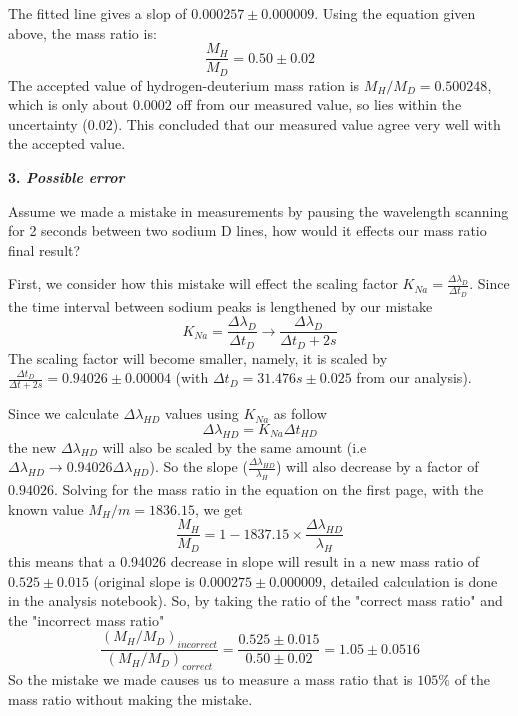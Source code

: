 \documentclass[12pt]{article}
\begin{document}
The fitted line gives a slop of $0.000257 \pm 0.000009$. Using the equation given above, the mass ratio is: $$\frac{M_H}{M_D} = 0.50 \pm 0.02$$
The accepted value of hydrogen-deuterium mass ration is $M_H/M_D = 0.500248$, which is only about $0.0002$ off from our measured value, so lies within the uncertainty ($0.02$). This concluded that our measured value agree very well with the accepted value.
\bigskip

\textbf{3. \textit{Possible error}}
\smallskip

Assume we made a mistake in measurements by pausing the wavelength scanning for 2 seconds between two sodium D lines, how would it effects our mass ratio final result?
\smallskip

First, we consider how this mistake will effect the scaling factor $K_{Na} = \frac{\Delta \lambda_{D}}{\Delta t_D}$. Since the time interval between sodium peaks is lengthened by our mistake
$$K_{Na} = \frac{\Delta \lambda_{D}}{\Delta t_D} \rightarrow \frac{\Delta \lambda_{D}}{\Delta t_D + 2s}$$
The scaling factor will become smaller, namely, it is scaled by $\frac{\Delta t_D}{\Delta t +2s} = 0.94026 \pm 0.00004$ (with $\Delta t_D = 31.476s \pm 0.025$ from our analysis).

Since we calculate $\Delta \lambda_{HD}$ values using $ K_{Na}$ as follow
$$ \Delta \lambda_{HD} = K_{Na} \Delta t_{HD}$$
the new $\Delta \lambda_{HD}$ will also be scaled by the same amount (i.e $\Delta \lambda_{HD} \rightarrow 0.94026 \Delta \lambda_{HD}$). So the slope ($\frac{\Delta \lambda_{HD}}{\lambda_H}$) will also decrease by a factor of $0.94026$. Solving for the mass ratio in the equation on the first page, with the known value $M_H / m = 1836.15$, we get 
$$\frac{M_H}{M_D} = 1- 1837.15 \times \frac{\Delta \lambda_{HD}}{\lambda_H}$$
this means that a 0.94026 decrease in slope will result in a new mass ratio of $0.525 \pm 0.015$ (original slope is $0.000275 \pm 0.000009$, detailed calculation is done in the analysis notebook). So, by taking the ratio of the "correct mass ratio" and the "incorrect mass ratio" 
$$\frac{(M_H/M_D)_{incorrect}}{(M_H/M_D)_{correct}} = \frac{0.525 \pm 0.015}{0.50 \pm 0.02} = 1.05 \pm 0.0516$$
So the mistake we made causes us to measure a mass ratio that is $105 \%$ of the mass ratio without making the mistake.  
\end{document}
